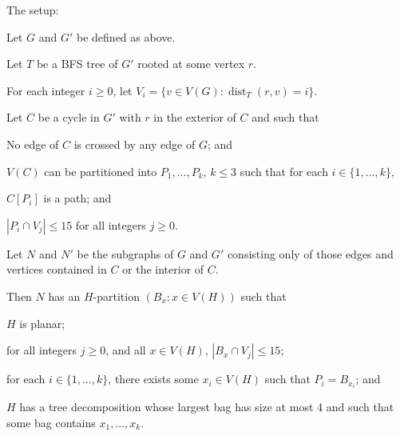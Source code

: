 \documentclass{patmorin}
\DeclareMathOperator{\dist}{dist}
\begin{document}
\begin{lem} The setup:
  \begin{compactenum}
    \item Let $G$ and $G'$ be defined as above.
    \item Let $T$ be a BFS tree of $G'$ rooted at some vertex $r$.
    \item For each integer $i\ge 0$, let $V_i=\{v\in V(G):\dist_T(r,v)=i\}$. 
    \item Let $C$ be a cycle in $G'$ with $r$ in the exterior of $C$ and such that
    \begin{compactenum} 
      \item No edge of $C$ is crossed by any edge of $G$; and
      \item $V(C)$ can be partitioned into $P_1,\ldots,P_k$, $k\le 3$ such that for each $i\in\{1,\ldots,k\}$,
      \begin{compactenum}
        \item $C[P_i]$ is a path; and
        \item $|P_i\cap V_j| \le 15$ for all integers $j\ge 0$.
      \end{compactenum}
    \end{compactenum}
    \item Let $N$ and $N'$ be the subgraphs of $G$ and $G'$ consisting only of those edges and vertices contained in $C$ or the interior of $C$.
  \end{compactenum}
  Then $N$ has an $H$-partition $(B_x : x\in V(H))$ such that
  \begin{compactenum}
    \item $H$ is planar;
    \item for all integers $j\ge 0$, and all $x\in V(H)$, $|B_x\cap V_j|\le 15$; 
    \item for each $i\in\{1,\ldots,k\}$, there exists some $x_i\in V(H)$ such that $P_i=B_{x_i}$; and
    \item $H$ has a tree decomposition whose largest bag has size at most 4 and such that some bag contains $x_1,\ldots,x_k$.
  \end{compactenum}
\end{lem}
\end{document}
